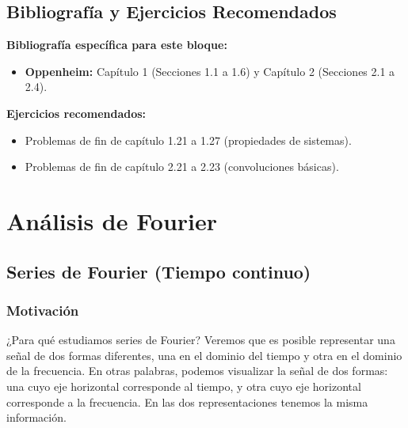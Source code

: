 \documentclass[11pt,a4paper,openany]{book}
\begin{document}
	
	\cleardoublepage
	\chapter*{Bibliografía y Ejercicios Recomendados}
	
	\textbf{Bibliografía específica para este bloque:}
	\begin{itemize}
		\item \textbf{Oppenheim:} Capítulo 1 (Secciones 1.1 a 1.6) y Capítulo 2 (Secciones 2.1 a 2.4).
	\end{itemize}
	
	\textbf{Ejercicios recomendados:}
	\begin{itemize}
		\item Problemas de fin de capítulo 1.21 a 1.27 (propiedades de sistemas).
		\item Problemas de fin de capítulo 2.21 a 2.23 (convoluciones básicas).
	\end{itemize}
	

\part{Análisis de Fourier}


\chapter{Series de Fourier (Tiempo continuo)}

\section{Motivación}

¿Para qué estudiamos series de Fourier? Veremos que es posible representar una señal de dos formas diferentes, una en el dominio del tiempo y otra en el dominio de la frecuencia. En otras palabras, podemos visualizar la señal de dos formas: una cuyo eje horizontal corresponde al tiempo, y otra cuyo eje horizontal corresponde a la frecuencia. En las dos representaciones tenemos la misma información.
\end{document}
